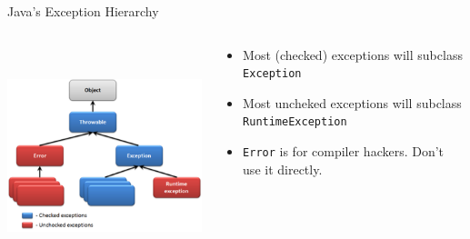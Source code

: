 \documentclass{beamer}
\begin{document}
\begin{frame}[fragile]{Java's Exception Hierarchy}

\begin{columns}[t]
\begin{column}{2in}
\begin{center}
\includegraphics[height=2.5in]{hierarchy_of_java_exceptions.png}
\end{center}
\end{column}
\begin{column}{3in}
\begin{itemize}
\item Most (checked) exceptions will subclass {\tt Exception}
\item Most uncheked exceptions will subclass {\tt RuntimeException}
\item {\tt Error} is for compiler hackers.  Don't use it directly.
\end{itemize}
\end{column}
\end{columns}

\end{frame}
\end{document}
